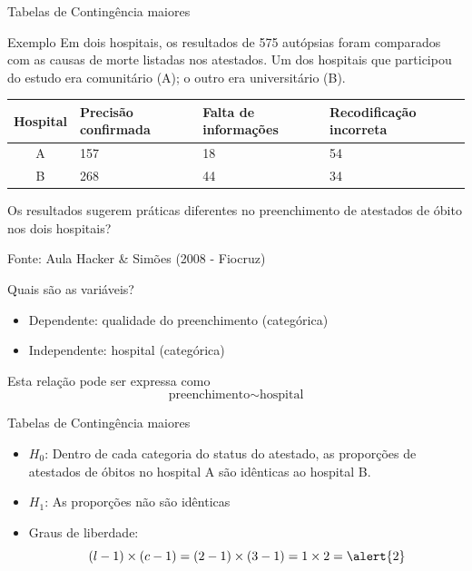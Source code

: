 \documentclass{beamer}
\begin{document}
\begin{frame}{Tabelas de Contingência maiores}
  \begin{exampleblock}{Exemplo}
    Em dois hospitais, os resultados de 575 autópsias
    foram comparados com as causas de morte listadas nos
    atestados. Um dos hospitais que participou do estudo era
    comunitário (A); o outro era universitário (B).

    \begin{tabular}{c|p{2cm}|p{2cm}|p{2cm}}
      Hospital & Precisão confirmada & Falta de informações &
      Recodificação incorreta \\
      \hline
      A & 157 & 18 & 54 \\
      \hline
      B & 268 & 44 & 34 \\
    \end{tabular}

    Os resultados sugerem práticas diferentes no preenchimento de
    atestados de óbito nos dois hospitais?
  \end{exampleblock}
  Fonte: Aula Hacker \& Simões (2008 - Fiocruz)
\end{frame}

\begin{frame}{Quais são as variáveis?}
  \begin{itemize}
    \small
  \item Dependente: qualidade do preenchimento (categórica)
  \item Independente: hospital (categórica)
  \end{itemize}
  \vfill
  \begin{block}{Esta relação pode ser expressa como}
    \begin{displaymath}
      \text{preenchimento} \sim \text{hospital}
    \end{displaymath}
  \end{block}
\end{frame}

\begin{frame}{Tabelas de Contingência maiores}
  \begin{itemize}
  \item $H_0$: Dentro de cada categoria do status do atestado, as
    proporções de atestados de óbitos no hospital A são idênticas ao
    hospital B.
  \item $H_1$: As proporções não são idênticas
  \item Graus de liberdade:
    \begin{displaymath}
      (l -1)\times (c-1) = (2-1) \times (3-1)
      = 1 \times 2 = \alert{2}
    \end{displaymath}
  \end{itemize}
\end{frame}
\end{document}
